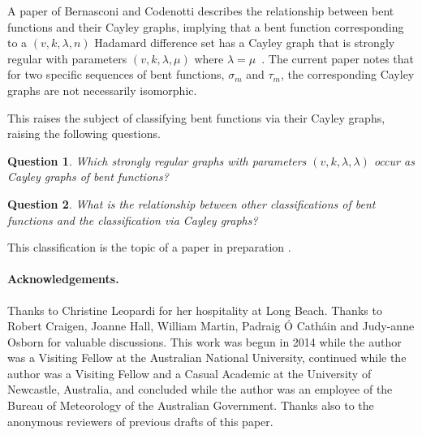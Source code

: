 \documentclass[12pt,a4paper]{article}
\newtheorem{Question}{Question}
\begin{document}
A paper of Bernasconi and Codenotti describes the relationship between bent functions and
their Cayley graphs, implying that a bent function corresponding to a $(v,k,\lambda,n)$ Hada\-mard difference set has a Cayley graph 
that is strongly regular with parameters $(v,k,\lambda,\mu)$ where $\lambda=\mu$~\cite[Lemma 12]{BerC99}.
The current paper notes that for two specific sequences of bent functions, $\sigma_m$ and $\tau_m$,
the corresponding Cayley graphs are not necessarily isomorphic.

This raises the subject of classifying bent functions via their Cayley graphs, raising the following questions.
\begin{Question}
Which strongly regular graphs with parameters $(v,k,\lambda,\lambda)$ occur as Cayley graphs of bent functions? 
\end{Question}
\begin{Question}
What is the relationship between other classifications of bent functions and the classification via Cayley graphs? 
\end{Question}
This classification is the topic of a paper in preparation \cite{Leo16Classifying}.

\paragraph*{Acknowledgements.}

Thanks to Christine Leopardi for her hospitality at Long Beach.
Thanks to Robert Craigen, Joanne Hall, William Martin,
Padraig {\'O} Cath{\'a}in and Judy-anne Osborn for valuable discussions.
This work was begun in 2014 while the author was a Visiting Fellow at the Australian National University, 
continued while the author was a Visiting Fellow and a Casual Academic at the University of Newcastle, Australia,
and concluded while the author was an employee of the Bureau of Meteorology of the Australian Government.
Thanks also to the anonymous reviewers of previous drafts of this paper.








%
\end{document}
